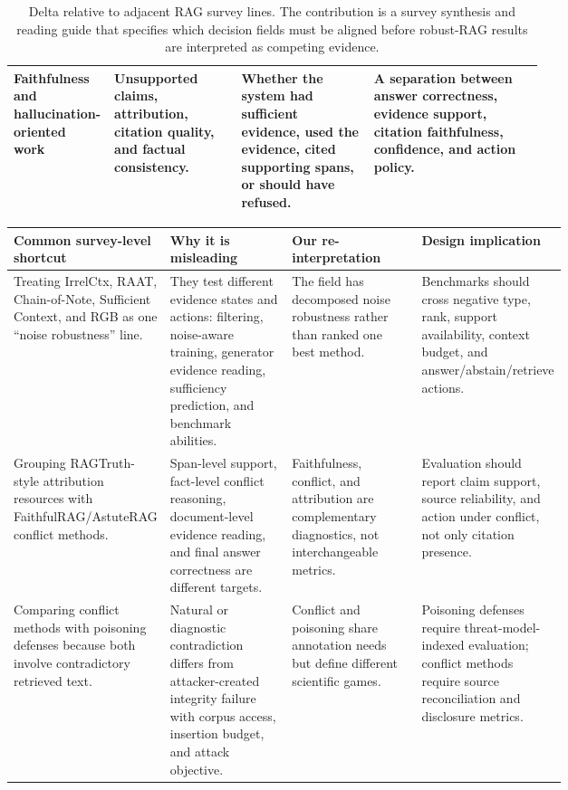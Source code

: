 \documentclass[11pt]{article}
\begin{document}
\begin{table}[t]
\begin{tabularx}{\linewidth}{>{\raggedright\arraybackslash}p{0.19\linewidth}>{\raggedright\arraybackslash}p{0.24\linewidth}>{\raggedright\arraybackslash}p{0.25\linewidth}X}
Faithfulness and hallucination-oriented work & Unsupported claims, attribution, citation quality, and factual consistency. & Whether the system had sufficient evidence, used the evidence, cited supporting spans, or should have refused. & A separation between answer correctness, evidence support, citation faithfulness, confidence, and action policy. \\
\bottomrule
\end{tabularx}
\caption{Delta relative to adjacent RAG survey lines. The contribution is a survey synthesis and reading guide that specifies which decision fields must be aligned before robust-RAG results are interpreted as competing evidence.}
\label{tab:prior-survey-delta-main}
\end{table}

\begin{table}[t]
\centering
\scriptsize
\renewcommand{\arraystretch}{0.9}
\begin{tabularx}{\linewidth}{>{\raggedright\arraybackslash}p{0.22\linewidth}>{\raggedright\arraybackslash}p{0.24\linewidth}>{\raggedright\arraybackslash}p{0.25\linewidth}X}
\toprule
\textbf{Common survey-level shortcut} & \textbf{Why it is misleading} & \textbf{Our re-interpretation} & \textbf{Design implication} \\
\midrule
Treating IrrelCtx, RAAT, Chain-of-Note, Sufficient Context, and RGB as one ``noise robustness'' line. & They test different evidence states and actions: filtering, noise-aware training, generator evidence reading, sufficiency prediction, and benchmark abilities. & The field has decomposed noise robustness rather than ranked one best method. & Benchmarks should cross negative type, rank, support availability, context budget, and answer/abstain/retrieve actions. \\
Grouping RAGTruth-style attribution resources with FaithfulRAG/AstuteRAG conflict methods. & Span-level support, fact-level conflict reasoning, document-level evidence reading, and final answer correctness are different targets. & Faithfulness, conflict, and attribution are complementary diagnostics, not interchangeable metrics. & Evaluation should report claim support, source reliability, and action under conflict, not only citation presence. \\
Comparing conflict methods with poisoning defenses because both involve contradictory retrieved text. & Natural or diagnostic contradiction differs from attacker-created integrity failure with corpus access, insertion budget, and attack objective. & Conflict and poisoning share annotation needs but define different scientific games. & Poisoning defenses require threat-model-indexed evaluation; conflict methods require source reconciliation and disclosure metrics. \\

\end{tabularx}
\end{table}
\end{document}
